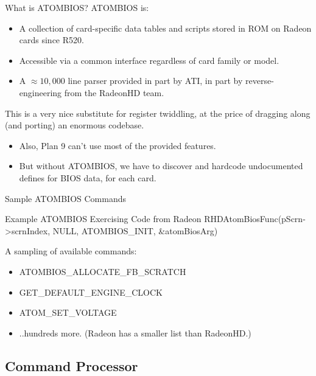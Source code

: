 \documentclass[xcolor=dvipsnames]{beamer}
\begin{document}
\begin{frame}[t]{What is ATOMBIOS?}
	ATOMBIOS is:
	\begin{itemize}
		\item A collection of card-specific data tables and scripts stored in ROM on Radeon cards since R520.
		\item Accessible via a common interface regardless of card family or model.
		\item A $\approx10,000$ line parser provided in part by ATI, in part by reverse-engineering from the RadeonHD team.
	\end{itemize}

	\pause This is a very nice substitute for register twiddling, at the price of dragging along (and porting) an enormous codebase.
	\begin{itemize}
		\item Also, Plan 9 can't use most of the provided features.
		\item But without ATOMBIOS, we have to discover and hardcode undocumented defines for BIOS data, for each card.
	\end{itemize}
\end{frame}


\begin{frame}[t]{Sample ATOMBIOS Commands}

	\begin{block}{Example ATOMBIOS Exercising Code from Radeon}
	RHDAtomBiosFunc(pScrn->scrnIndex, NULL, ATOMBIOS\_INIT, \&atomBiosArg)
	\end{block}

	A sampling of available commands:
	\begin{itemize}
		\item ATOMBIOS\_ALLOCATE\_FB\_SCRATCH
		\item GET\_DEFAULT\_ENGINE\_CLOCK
		\item ATOM\_SET\_VOLTAGE
		\item ..hundreds more. (Radeon has a smaller list than RadeonHD.)
	\end{itemize}
\end{frame}


\subsection{Command Processor}
\end{document}
